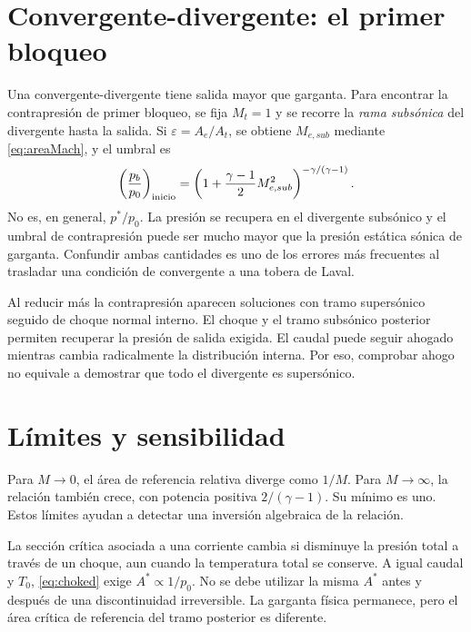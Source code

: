 \section{Convergente-divergente: el primer bloqueo}
Una convergente-divergente tiene salida mayor que garganta. Para encontrar la contrapresión de primer bloqueo, se fija $M_t=1$ y se recorre la \emph{rama subsónica} del divergente hasta la salida. Si $\varepsilon=A_e/A_t$, se obtiene $M_{e,sub}$ mediante \eqref{eq:areaMach}, y el umbral es
\begin{equation}\label{eq:firstchoking}
 \left(\frac{p_b}{p_0}\right)_{\rm inicio}=
 \left(1+\frac{\gamma-1}{2}M_{e,sub}^2\right)^{-\gamma/(\gamma-1)}.
\end{equation}
No es, en general, $p^*/p_0$. La presión se recupera en el divergente subsónico y el umbral de contrapresión puede ser mucho mayor que la presión estática sónica de garganta. Confundir ambas cantidades es uno de los errores más frecuentes al trasladar una condición de convergente a una tobera de Laval.

Al reducir más la contrapresión aparecen soluciones con tramo supersónico seguido de choque normal interno. El choque y el tramo subsónico posterior permiten recuperar la presión de salida exigida. El caudal puede seguir ahogado mientras cambia radicalmente la distribución interna. Por eso, comprobar ahogo no equivale a demostrar que todo el divergente es supersónico.
\section{Límites y sensibilidad}
Para $M\to0$, el área de referencia relativa diverge como $1/M$. Para $M\to\infty$, la relación también crece, con potencia positiva $2/(\gamma-1)$. Su mínimo es uno. Estos límites ayudan a detectar una inversión algebraica de la relación.

La sección crítica asociada a una corriente cambia si disminuye la presión total a través de un choque, aun cuando la temperatura total se conserve. A igual caudal y $T_0$, \eqref{eq:choked} exige $A^*\propto1/p_0$. No se debe utilizar la misma $A^*$ antes y después de una discontinuidad irreversible. La garganta física permanece, pero el área crítica de referencia del tramo posterior es diferente.\cite{MIT03}

